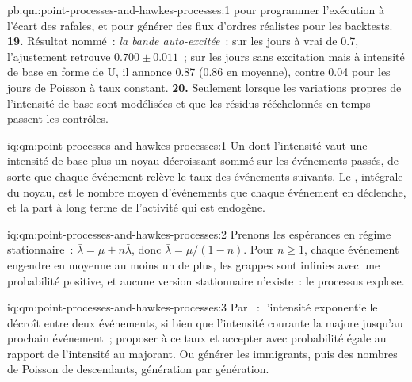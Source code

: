 \begin{solution}{pb:qm:point-processes-and-hawkes-processes:1}
pour programmer l'exécution à l'écart des rafales, et pour générer des flux d'ordres réalistes pour les backtests.
\textbf{19.} Résultat nommé~: \emph{la bande auto-excitée}~: sur les jours à  vrai de 0.7, l'ajustement
retrouve $0.700 \pm 0.011$~; sur les jours sans excitation mais à intensité de base en forme de U, il annonce 0.87 (0.86 en moyenne),
contre 0.04 pour les jours de Poisson à taux constant.
\textbf{20.} Seulement lorsque les variations propres de l'intensité de base sont modélisées et que les résidus rééchelonnés en temps passent les contrôles.
\end{solution}

\begin{solution}{iq:qm:point-processes-and-hawkes-processes:1}
Un  dont l'intensité vaut une intensité de base plus un noyau décroissant sommé sur les événements passés, de sorte que chaque événement
relève le taux des événements suivants. Le , intégrale du noyau, est le nombre moyen d'événements
que chaque événement en déclenche, et la part à long terme de l'activité qui est endogène.
\end{solution}

\begin{solution}{iq:qm:point-processes-and-hawkes-processes:2}
Prenons les espérances en régime stationnaire~: $\bar\lambda = \mu + n\bar\lambda$, donc $\bar\lambda = \mu/(1 - n)$. Pour $n \ge 1$, chaque événement engendre en
moyenne au moins un de plus, les grappes sont infinies avec une probabilité positive, et aucune version stationnaire
n'existe~: le processus explose.
\end{solution}

\begin{solution}{iq:qm:point-processes-and-hawkes-processes:3}
Par ~: l'intensité exponentielle décroît entre deux événements, si bien que l'intensité courante la majore jusqu'au
prochain événement~; proposer à ce taux et accepter avec probabilité égale au rapport de l'intensité au majorant. Ou générer les immigrants,
puis des nombres de Poisson de descendants, génération par génération.
\end{solution}

